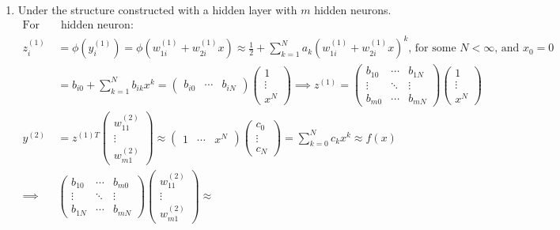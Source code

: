 \documentclass[12pt]{article}
\begin{document}
\begin{enumerate}
	\item Under the structure constructed with a hidden layer with $m$ hidden neurons.
	\begin{align*}
		\text{For every} &\text{ hidden neuron: } \\
		z^{(1)}_i &= \phi(y^{(1)}_i) = \phi(w^{(1)}_{1i} + w^{(1)}_{2i}x) \approx 
		\frac{1}{2} + \displaystyle\sum_{k=1}^{N} a_k (w^{(1)}_{1i} + w^{(1)}_{2i}x)^{k} \text{, for some } N < \infty \text{, and $x_0 = 0$} \\
		&= b_{i0} + \sum_{k=1}^N b_{ik} x^{k} = \begin{pmatrix}b_{i0} & \cdots &b_{iN}\end{pmatrix} 
		\begin{pmatrix}1 \\ \vdots \\ x^N\end{pmatrix}
		\implies z^{(1)} = \begin{pmatrix}b_{10} & \cdots & b_{1N} \\ \vdots & \ddots & \vdots \\ b_{m0} & \cdots & b_{mN}\end{pmatrix}
		\begin{pmatrix}1 \\ \vdots \\ x^N\end{pmatrix} \\
		y^{(2)} &= z^{(1)T} \begin{pmatrix}w^{(2)}_{11} \\ \vdots \\ w^{(2)}_{m1}\end{pmatrix} \approx 
		\begin{pmatrix}1 & \cdots & x^N\end{pmatrix}
		\begin{pmatrix}c_0 \\ \vdots \\ c_N\end{pmatrix} = \sum_{k=0}^N c_k x^k \approx f(x)\\
		\implies &\begin{pmatrix}b_{10} & \cdots & b_{m0} \\ \vdots & \ddots & \vdots \\ b_{1N} & \cdots & b_{mN}\end{pmatrix}
		\begin{pmatrix}w^{(2)}_{11} \\ \vdots \\ w^{(2)}_{m1}\end{pmatrix} \approx

\end{align*}
\end{enumerate}
\end{document}
